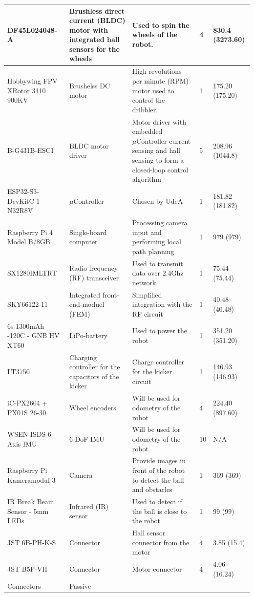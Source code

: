 \documentclass[a4paper,4pt]{article}
\begin{document}
\begin{longtable}{|p{3cm}|p{3cm}|p{3cm}|p{1cm}|p{2cm}| }
    DF45L024048-A & Brushless direct current (BLDC) motor with
    integrated hall sensors for the wheels & Used to spin the wheels of
    the robot. & 4 & 830.4 (3273.60)\\ \hline Hobbywing FPV XRotor 3110
    900KV & Brushelss DC motor & High revolutions per minute (RPM) motor
    used to control the dribbler. & 1 & 175.20 (175.20) \\ \hline
    B-G431B-ESC1 & BLDC motor driver & Motor driver with embedded
    $\mu\text{Controller}$ current sensing and hall sensing to form a
    closed-loop control algorithm & 5 & 208.96 (1044.8) \\ \hline
    ESP32-S3-DevKitC-1-N32R8V & $\mu\text{Controller}$ & Chosen by UdeA
    & 1 & 181.82 (181.82) \\ \hline Raspberry Pi 4 Model B/8GB &
    Single-board computer & Processing camera input and performing local
    path planning & 1 & 979 (979) \\ \hline SX1280IMLTRT & Radio
    frequency (RF) transceiver & Used to transmit data over 2.4Ghz
    network & 1 & 75.44 (75.44) \\ \hline SKY66122-11 & Integrated
    front-end-moduel (FEM) & Simplified integration with the RF circuit
    & 1 & 40.48 (40.48) \\ \hline 6s 1300mAh -120C - GNB HV XT60 &
    LiPo-battery & Used to power the robot & 1 & 351.20 (351.20) \\
    \hline LT3750 & Charging controller for the capacitors of the kicker
    & Charge controller for the kicker circuit & 1 & 146.93 (146.93)\\
    \hline iC-PX2604 + PX01S 26-30 & Wheel encoders & Will be used for
    odometry of the robot & 4 & 224.40 (897.60) \\ \hline WSEN-ISDS 6
    Axis IMU & 6-DoF IMU & Will be used for odometry of the robot & 10 &
    N/A\\ \hline Raspberry Pi Kameramodul 3 & Camera & Provide images in
    front of the robot to detect the ball and obstacles & 1 & 369 (369)
    \\ \hline IR Break Beam Sensor - 5mm LEDs & Infrared (IR) sensor &
    Used to detect if the ball is close to the robot & 1 & 99 (99) \\
    \hline JST 6B-PH-K-S & Connector & Hall sensor connector from the
    motor & 4 & 3.85 (15.4) \\ \hline JST B5P-VH & Connector & Motor
    connector & 4 & 4.06 (16.24) \\ \hline Connectors & Passive

\end{longtable}
\end{document}
